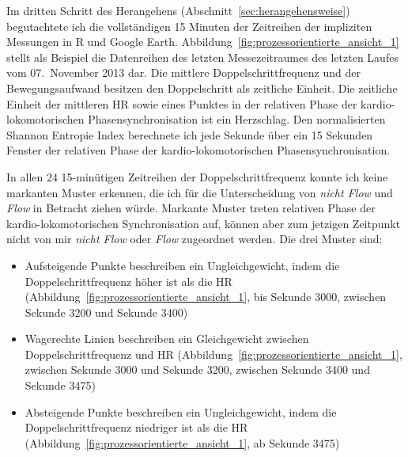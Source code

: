 \label{ssub:prozessorientierter_ansatz_1} 
\begin{sidewaysfigure}
	\resizebox{1.00 
	\textwidth}{!}{
	
	 }
	
	\caption[Beispielhafte Prozessdarstellung des letzten Laufabschnittes vom 07. November 2013 (Erste Studie: Laufen)]{Beispielhafte Prozessdarstellung des letzten Laufabschnittes vom 07. November 2013 \\
	\hspace{ 
	\textwidth} \emph{Anmerkung}: Rel. Phase = Relative Phase} \label{fig:prozessorientierte_ansicht_1} 
\end{sidewaysfigure}

Im dritten Schritt des Herangehens (Abschnitt~\ref{sec:herangehensweise}) begutachtete ich die vollständigen 15 Minuten der Zeitreihen der impliziten Messungen in R und Google Earth. Abbildung~\ref{fig:prozessorientierte_ansicht_1} stellt als Beispiel die Datenreihen des letzten Messezeitraumes des letzten Laufes vom 07.~November 2013 dar. Die mittlere Doppelschrittfrequenz und der Bewegungsaufwand besitzen den Doppelschritt als zeitliche Einheit. Die zeitliche Einheit der mittleren \ac{HR} sowie eines Punktes in der relativen Phase der kardio-lokomotorischen Phasensynchronisation ist ein Herzschlag. Den normalisierten Shannon Entropie Index berechnete ich jede Sekunde über ein 15 Sekunden Fenster der relativen Phase der kardio-lokomotorischen Phasensynchronisation. 

In allen 24 15-minütigen Zeitreihen der Doppelschrittfrequenz konnte ich keine markanten Muster erkennen, die ich für die Unterscheidung von \emph{nicht Flow} und \emph{Flow} in Betracht ziehen würde. Markante Muster treten relativen Phase der kardio-lokomotorischen Synchronisation auf, können aber zum jetzigen Zeitpunkt nicht von mir \emph{nicht Flow} oder \emph{Flow} zugeordnet werden. Die drei Muster sind: 
\begin{itemize}
	
	\item Aufsteigende Punkte beschreiben ein Ungleichgewicht, indem die Doppelschrittfrequenz höher ist als die \ac{HR} (Abbildung~\ref{fig:prozessorientierte_ansicht_1}, bis Sekunde 3000, zwischen Sekunde 3200 und Sekunde 3400)
	
	\item Wagerechte Linien beschreiben ein Gleichgewicht zwischen Doppelschrittfrequenz und \ac{HR} (Abbildung~\ref{fig:prozessorientierte_ansicht_1}, zwischen Sekunde 3000 und Sekunde 3200, zwischen Sekunde 3400 und Sekunde 3475)
	
	\item Absteigende Punkte beschreiben ein Ungleichgewicht, indem die Doppelschrittfrequenz niedriger ist als die \ac{HR} (Abbildung~\ref{fig:prozessorientierte_ansicht_1}, ab Sekunde 3475) 
\end{itemize}

